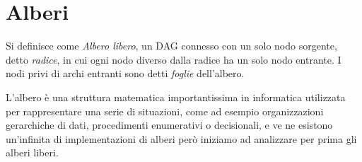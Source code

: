 \section{Alberi}
Si definisce come \emph{Albero libero}, un DAG connesso con un solo nodo sorgente, detto \emph{radice},
in cui ogni nodo diverso dalla radice ha un solo nodo entrante.\newline
I nodi privi di archi entranti sono detti \emph{foglie} dell'albero.


L'albero è una struttura matematica importantissima in informatica utilizzata per
rappresentare una serie di situazioni, come ad esempio organizzazioni gerarchiche di dati,
procedimenti enumerativi o decisionali, e ve ne esistono un'infinita di implementazioni di alberi
però iniziamo ad analizzare per prima gli alberi liberi.

